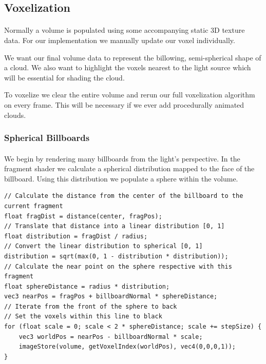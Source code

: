 \subsection{Voxelization}\paragraph{}
Normally a volume is populated using some accompanying static 3D texture data. For our implementation we manually update our voxel individually. 

We want our final volume data to represent the billowing, semi-spherical shape of a cloud. We also want to highlight the voxels nearest to the light source which will be essential for shading the cloud. 

To voxelize we clear the entire volume and rerun our full voxelization algorithm on every frame. This will be necessary if we ever add procedurally animated clouds. 

\subsubsection{Spherical Billboards}\paragraph{}
We begin by rendering many billboards from the light's perspective. In the fragment shader we calculate a spherical distribution mapped to the face of the billboard. Using this distribution we populate a sphere within the volume. 

\begin{lstlisting}[caption={first\_voxelize.glsl, 51}]
// Calculate the distance from the center of the billboard to the current fragment
float fragDist = distance(center, fragPos);
// Translate that distance into a linear distribution [0, 1]
float distribution = fragDist / radius;
// Convert the linear distribution to spherical [0, 1]
distribution = sqrt(max(0, 1 - distribution * distribution));
// Calculate the near point on the sphere respective with this fragment
float sphereDistance = radius * distribution;
vec3 nearPos = fragPos + billboardNormal * sphereDistance;
// Iterate from the front of the sphere to back 
// Set the voxels within this line to black
for (float scale = 0; scale < 2 * sphereDistance; scale += stepSize) {
	vec3 worldPos = nearPos - billboardNormal * scale;
	imageStore(volume, getVoxelIndex(worldPos), vec4(0,0,0,1));
}
\end{lstlisting}\paragraph{}

